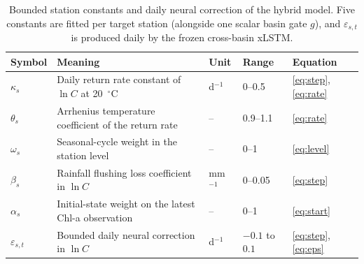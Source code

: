 \begin{table}[tbp]
\centering
\caption{Bounded station constants and daily neural correction of the hybrid model. Five constants are fitted per target station (alongside one scalar basin gate $g$), and $\varepsilon_{s,t}$ is produced daily by the frozen cross-basin xLSTM.}
\label{tab:constants}
\footnotesize\linespread{1}\selectfont
\setlength{\tabcolsep}{4pt}
\renewcommand{\arraystretch}{1.05}
\begin{tabular}{@{}l>{\raggedright\arraybackslash}p{}lll@{}}
\toprule
Symbol & Meaning & Unit & Range & Equation \\
\midrule
$\kappa_s$ & Daily return rate constant of $\ln C$ at 20~$^\circ$C & d$^{-1}$ & 0--0.5 & \eqref{eq:step}, \eqref{eq:rate} \\
$\theta_s$ & Arrhenius temperature coefficient of the return rate & -- & 0.9--1.1 & \eqref{eq:rate} \\
$\omega_s$ & Seasonal-cycle weight in the station level & -- & 0--1 & \eqref{eq:level} \\
$\beta_s$ & Rainfall flushing loss coefficient in $\ln C$ & mm$^{-1}$ & 0--0.05 & \eqref{eq:step} \\
$\alpha_s$ & Initial-state weight on the latest Chl-a observation & -- & 0--1 & \eqref{eq:start} \\
\midrule
$\varepsilon_{s,t}$ & Bounded daily neural correction in $\ln C$ & d$^{-1}$ & $-0.1$ to $0.1$ & \eqref{eq:step}, \eqref{eq:eps} \\
\bottomrule
\end{tabular}
\end{table}
